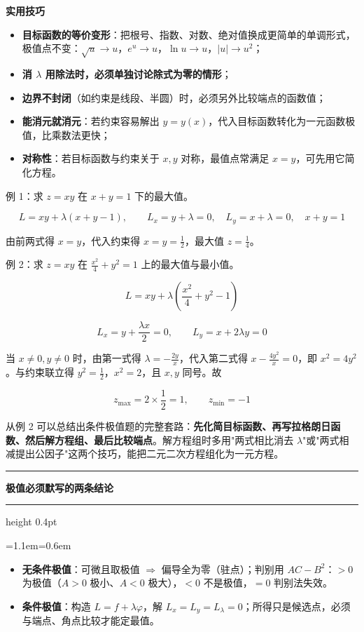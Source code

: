 \documentclass[11pt,openany,UTF8]{ctexbook}
\newcommand{\callouthead}[2]{%
  \par\addvspace{7pt}\noindent
  {\color{#1}\rule[-0.15em]{3pt}{1.05em}}\hspace{0.5em}%
  {\bfseries\color{#1}#2}\par\nobreak\vspace{-0.35em}%
  {\color{rulesep}\hrule height 0.4pt}\nobreak\vspace{0.45em}%
  \begingroup\small\setlength{\parindent}{0pt}%
  \leftskip=1.1em\rightskip=0.6em\noindent\ignorespaces}
\newcommand{\calloutend}{\par\endgroup\addvspace{7pt}}
\newenvironment{callkey}[1]{\callouthead{keybar}{#1}}{\calloutend}
\begin{document}
\textbf{实用技巧}

\begin{itemize}
\item \textbf{目标函数的等价变形}：把根号、指数、对数、绝对值换成更简单的单调形式，极值点不变：$\sqrt{u}\to u$，$e^{u}\to u$，$\ln u\to u$，$\vert u\vert\to u^{2}$；
\item \textbf{消 $\lambda$ 用除法时，必须单独讨论除式为零的情形}；
\item \textbf{边界不封闭}（如约束是线段、半圆）时，必须另外比较端点的函数值；
\item \textbf{能消元就消元}：若约束容易解出 $y=y(x)$，代入目标函数转化为一元函数极值，比乘数法更快；
\item \textbf{对称性}：若目标函数与约束关于 $x,y$ 对称，最值点常满足 $x=y$，可先用它简化方程。
\end{itemize}
例 1：求 $z=xy$ 在 $x+y=1$ 下的最大值。

\[L=xy+\lambda(x+y-1),\qquad L_x=y+\lambda=0,\quad L_y=x+\lambda=0,\quad x+y=1\]

由前两式得 $x=y$，代入约束得 $x=y=\frac12$，最大值 $z=\frac14$。

例 2：求 $z=xy$ 在 $\frac{x^{2}}{4}+y^{2}=1$ 上的最大值与最小值。

\[L=xy+\lambda\left(\frac{x^{2}}{4}+y^{2}-1\right)\]

\[L_x=y+\frac{\lambda x}{2}=0,\qquad L_y=x+2\lambda y=0\]

当 $x\ne 0,y\ne 0$ 时，由第一式得 $\lambda=-\frac{2y}{x}$，代入第二式得 $x-\frac{4y^{2}}{x}=0$，即 $x^{2}=4y^{2}$。与约束联立得 $y^{2}=\frac12$，$x^{2}=2$，且 $x,y$ 同号。故

\[z_{\max}=2\times\frac12=1,\qquad z_{\min}=-1\]

从例 2 可以总结出条件极值题的完整套路：\textbf{先化简目标函数、再写拉格朗日函数、然后解方程组、最后比较端点}。解方程组时多用"两式相比消去 $\lambda$"或"两式相减提出公因子"这两个技巧，能把二元二次方程组化为一元方程。

\begin{callkey}{极值必须默写的两条结论}
\begin{itemize}
\item \textbf{无条件极值}：可微且取极值 $\Rightarrow$ 偏导全为零（驻点）；判别用 $AC-B^{2}$：$>0$ 为极值（$A>0$ 极小、$A<0$ 极大），$<0$ 不是极值，$=0$ 判别法失效。
\item \textbf{条件极值}：构造 $L=f+\lambda\varphi$，解 $L_x=L_y=L_\lambda=0$；所得只是候选点，必须与端点、角点比较才能定最值。
\end{itemize}
\end{callkey}
\end{document}
